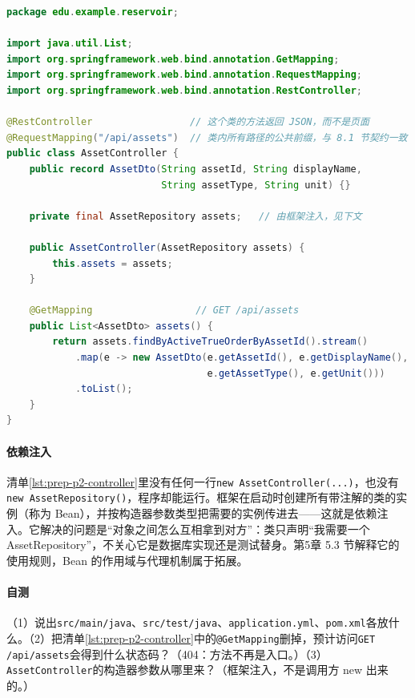 \begin{lstlisting}[label={lst:prep-p2-controller},language=Java,caption={最小的 HTTP 接口：注解告诉框架“这是入口”}]
package edu.example.reservoir;

import java.util.List;
import org.springframework.web.bind.annotation.GetMapping;
import org.springframework.web.bind.annotation.RequestMapping;
import org.springframework.web.bind.annotation.RestController;

@RestController                 // 这个类的方法返回 JSON，而不是页面
@RequestMapping("/api/assets")  // 类内所有路径的公共前缀，与 8.1 节契约一致
public class AssetController {
    public record AssetDto(String assetId, String displayName,
                           String assetType, String unit) {}

    private final AssetRepository assets;   // 由框架注入，见下文

    public AssetController(AssetRepository assets) {
        this.assets = assets;
    }

    @GetMapping                  // GET /api/assets
    public List<AssetDto> assets() {
        return assets.findByActiveTrueOrderByAssetId().stream()
            .map(e -> new AssetDto(e.getAssetId(), e.getDisplayName(),
                                   e.getAssetType(), e.getUnit()))
            .toList();
    }
}
\end{lstlisting}

\paragraph{依赖注入}清单\ref{lst:prep-p2-controller}里没有任何一行\texttt{new AssetController(...)}，也没有\texttt{new AssetRepository()}，程序却能运行。框架在启动时创建所有带注解的类的实例（称为 Bean），并按构造器参数类型把需要的实例传进去——这就是依赖注入。它解决的问题是“对象之间怎么互相拿到对方”：类只声明“我需要一个 AssetRepository”，不关心它是数据库实现还是测试替身。第5章 5.3 节解释它的使用规则，Bean 的作用域与代理机制属于拓展。

\paragraph{自测}（1）说出\texttt{src/main/java}、\texttt{src/test/java}、\texttt{application.yml}、\texttt{pom.xml}各放什么。（2）把清单\ref{lst:prep-p2-controller}中的\texttt{@GetMapping}删掉，预计访问\texttt{GET /api/assets}会得到什么状态码？（404：方法不再是入口。）（3）\texttt{AssetController}的构造器参数从哪里来？（框架注入，不是调用方 new 出来的。）

